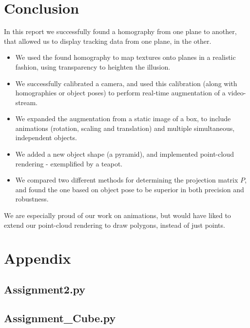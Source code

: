 \documentclass[a4paper,11pt]{article}
\begin{document}
\section{Conclusion}
In this report we successfully found a homography from one plane to another, that allowed us to display tracking data from one plane, in the other.
\begin{itemize}
\item
We used the found homography to map textures onto planes in a realistic fashion, using transparency to heighten the illusion.
\item
We successfully calibrated a camera, and used this calibration (along with homographies or object poses) to perform real-time augmentation of a video-stream.
\item
We expanded the augmentation from a static image of a box, to include animations (rotation, scaling and translation) and multiple simultaneous, independent objects.
\item
We added a new object shape (a pyramid), and implemented point-cloud rendering - exemplified by a teapot.
\item
We compared two different methods for determining the projection matrix $P$, and found the one based on object pose to be superior in both precision and robustness.
\end{itemize}
We are especially proud of our work on animations, but would have liked to extend our point-cloud rendering to draw polygons, instead of just points.

\newpage
\section*{Appendix}
\subsection*{Assignment2.py}

\subsection*{Assignment\_Cube.py}

\end{document}
